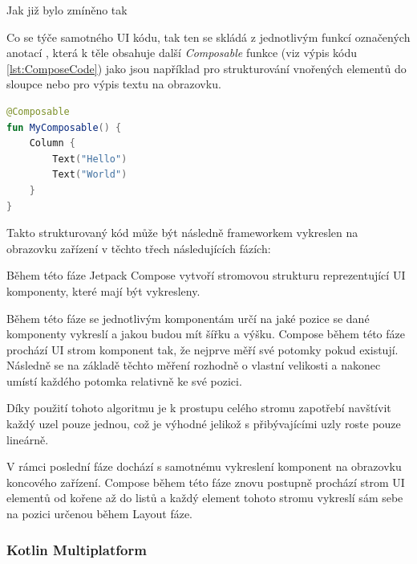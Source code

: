 Jak již bylo zmíněno tak 



Co se týče samotného UI kódu, tak ten se skládá z jednotlivým funkcí označených anotací , která k těle obsahuje další
\textit{Composable} funkce (viz výpis kódu \ref{lst:ComposeCode}) jako jsou například  pro strukturování vnořených elementů do sloupce nebo  pro výpis
textu na obrazovku. 


\begin{lstlisting}[caption={Popis UI widgetů pomocí jazyka Kotlin}, label={lst:ComposeCode}, language=Kotlin]
@Composable
fun MyComposable() {
    Column {
        Text("Hello")
        Text("World")
    }
}
\end{lstlisting}

Takto strukturovaný kód může být následně frameworkem vykreslen na obrazovku zařízení v těchto třech následujících fázích:

Během této fáze Jetpack Compose vytvoří stromovou strukturu reprezentující UI komponenty, které mají být vykresleny.\cite{jetpackPhases}

Během této fáze se jednotlivým komponentám určí na jaké pozice se dané komponenty vykreslí a jakou budou mít šířku a výšku.
Compose během této fáze prochází UI strom komponent tak, že nejprve měří své potomky pokud existují. Následně se na základě těchto
měření rozhodně o vlastní velikosti a nakonec umístí každého potomka relativně ke své pozici.\cite{jetpackPhases}

Díky použití tohoto algoritmu je k prostupu celého stromu zapotřebí navštívit každý uzel pouze jednou, což je výhodné jelikož
s přibývajícími uzly roste pouze lineárně. \cite{jetpackPhases}

V rámci poslední fáze dochází s samotnému vykreslení komponent na obrazovku koncového zařízení. \cite{jetpackPhases}
Compose během této fáze znovu postupně prochází strom UI elementů od kořene až do listů a každý element tohoto stromu vykreslí sám sebe 
na pozici určenou během Layout fáze. \cite{jetpackPhases}

\subsubsection{Kotlin Multiplatform} \label{kmpSection}



